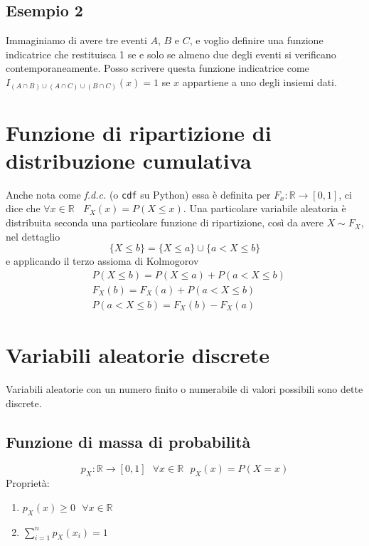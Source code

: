 \documentclass[11pt]{report}
\begin{document}
\subsection{Esempio 2}
Immaginiamo di avere tre eventi $A$, $B$ e $C$, e voglio definire una funzione indicatrice che restituisca 1 se e solo se almeno due degli eventi si verificano contemporaneamente. Posso scrivere questa funzione indicatrice come $I_{(A \cap B) \cup (A \cap C) \cup (B \cap C)}(x) = 1$ se $x$ appartiene a uno degli insiemi dati.

\section{Funzione di ripartizione di distribuzione cumulativa}
Anche nota come \textit{f.d.c.} (o \texttt{cdf} su Python) essa è definita per $F_x : \mathbb{R} \rightarrow [0,1]$, ci dice che $\forall x \in \mathbb{R}\ \ \ \ F_X(x) = P(X \leq x)$. Una particolare variabile aleatoria è distribuita seconda una particolare funzione di ripartizione, così da avere $X \sim F_X$, nel dettaglio
\begin{equation}
    \{X \leq b\} = \{X \leq a\} \cup \{a < X \leq b\}
\end{equation}
e applicando il terzo assioma di Kolmogorov
\begin{equation}
    \begin{split}
        & P(X \leq b) = P(X \leq a) + P(a < X \leq b)\\
        & F_X(b) = F_X(a) + P(a < X \leq b)\\
        & P(a < X \leq b) = F_X(b) - F_X(a)
    \end{split}
\end{equation}

\section{Variabili aleatorie discrete}
Variabili aleatorie con un numero finito o numerabile di valori possibili sono dette discrete.
\subsection{Funzione di massa di probabilità}
$$p_X : \mathbb{R} \rightarrow [0,1]\ \ \ \forall x \in \mathbb{R}\ \ \ p_X(x) = P(X=x)$$
Proprietà:
\begin{enumerate}
	\item $p_X(x) \geq 0\ \ \ \forall x \in \mathbb{R}$
	\item $\sum_{i=1}^{n}p_X(x_i) = 1$
\end{enumerate}
\end{document}
